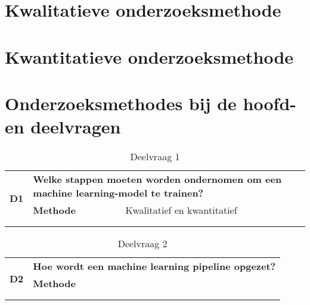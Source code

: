 
\section{Kwalitatieve onderzoeksmethode}

\section{Kwantitatieve onderzoeksmethode}

\section{Onderzoeksmethodes bij de hoofd- en deelvragen}

\begin{table}[hbt!]
  \centering
  \begin{tabular}{|c|l|l|}
  \hline
  \multirow{4}{*}{\textbf{D1}} & \multicolumn{2}{p{.9155\linewidth}|}{\textbf{Welke stappen moeten worden ondernomen om een machine learning-model te trainen?}} \\ \cline{2-3} 
                             & \textbf{Methode}&Kwalitatief en kwantitatief\\ \cline{2-3} 
                             & \textbf{}&\\ \cline{2-3} 
                             & \textbf{}&\\ \hline
  \end{tabular}
  \caption{Deelvraag 1}
  \label{table:sq1}
\end{table}

\begin{table}[hbt!]
  \centering
  \begin{tabular}{|c|l|l|}
  \hline
  \multirow{4}{*}{\textbf{D2}} & \multicolumn{2}{p{.9155\linewidth}|}{\textbf{Hoe wordt een machine learning pipeline opgezet?}} \\ \cline{2-3} 
                             & \textbf{Methode}&\\ \cline{2-3} 
                             & \textbf{}&\\ \cline{2-3} 
                             & \textbf{}&\\ \hline
  \end{tabular}
  \caption{Deelvraag 2}
  \label{table:sq2}
\end{table}

